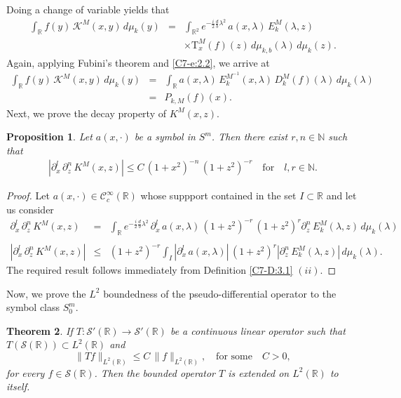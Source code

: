 \documentclass[12pt,a4paper,reqno]{amsproc}
\newtheorem{theorem}{Theorem}[section]
\newtheorem{proposition}[theorem]{Proposition}
\theoremstyle{definition}
\theoremstyle{remark}
\numberwithin{equation}{section}
\newcommand{\Tau}{\mathrm{T}}
\begin{document}
Doing a change of variable yields that
\begin{eqnarray*}
\int_{\mathbb{R}}f(y)\, \mathcal{K}^M(x,y)\,d\mu_k(y) &=& \int_{\mathbb{R}^2} e^{-\frac{i}{2}\frac{d}{b}\lambda^2}\,a(x,\lambda)\,E_k^M(\lambda,z)\\&& \times\Tau_x^M(f)(z)\,d\mu_{k,b}(\lambda)\,d\mu_k(z).  
\end{eqnarray*}
Again, applying Fubini's theorem and \eqref{C7-e:2.2}, we arrive at
\begin{eqnarray*}
\int_{\mathbb{R}}f(y)\, \mathcal{K}^M(x,y)\,d\mu_k(y) &=&\int_{\mathbb{R}}a(x,\lambda)\,E^{M^{-1}}_{k}(x,\lambda)\,D^M_{k}(f)(\lambda)\,d\mu_k(\lambda) \\
&=& P_{k,M}(f)(x).
\end{eqnarray*}
 Next, we prove the decay property of $K^M(x,z)$.
\begin{proposition}
 Let $a(x,\cdot)$ be a symbol in $S^m$. Then there exist $r,n\in\mathbb{N}$ such that
 \begin{eqnarray*}
\left| \partial^l_x\,\partial^n_z\, K^M(x,z) \right| \le  C\,(1+x^2)^{-n}\,(1+z^2)^{-r} \quad \text{for}\quad l,r\in\mathbb{N}.
\end{eqnarray*}
\end{proposition}
\begin{proof}
Let $a(x,\cdot) \in \mathcal{C}_c^\infty(\mathbb{R})$ whose suppport contained in the set $I \subset \mathbb{R}$ and let us consider
 \begin{eqnarray*}
\partial^l_x\,\partial^n_z\,K^M(x,z)  &=& \int_{\mathbb{R}}  e^{-\frac{i}{2}\frac{d}{b}\lambda^2}\, \partial^l_x\,a(x,\lambda)\,(1+z^2)^{-r}\,(1+z^2)^{r} \partial^n_z\,E_k^M(\lambda,z)\,d\mu_k(\lambda) \\\\
\left|\partial^l_x\,\partial^n_z\,K^M(x,z) \right|&\le& (1+z^2)^{-r}\int_I \left| \partial^l_x\,a(x,\lambda)\right|\,(1+z^2)^{r} \left| \partial^n_z\,E_k^M(\lambda,z)\right|\,d\mu_k(\lambda).
\end{eqnarray*}
 The required result follows immediately from Definition \ref{C7-D:3.1} $(ii)$.
\end{proof}
 Now, we prove the $L^2$ boundedness of the pseudo-differential operator to the symbol class $S^m_0$. 
 \begin{theorem} \cite{Ruzhansky}
 If $T: \mathcal{S}'(\mathbb{R}) \to \mathcal{S}'(\mathbb{R})$ be a continuous linear operator such that $T(\mathcal{S}(\mathbb{R})) \subset L^2(\mathbb{R})$ and
 \begin{equation*}
     \|Tf\|_{L^2(\mathbb{R})} \le C\,\|f\|_{L^2(\mathbb{R})}, \quad \text{for some} \quad C>0,
 \end{equation*}
 for every $f\in \mathcal{S}(\mathbb{R})$. Then the bounded operator $T$ is extended on $L^2(\mathbb{R})$ to itself. 
 \end{theorem}
\end{document}
